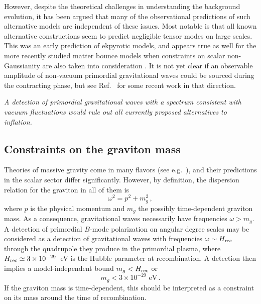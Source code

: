 However, despite the theoretical challenges in understanding the background evolution, it has been argued that many 
of the observational predictions of such alternative models are independent of these issues.
Most notable is that all known alternative constructions seem to predict negligible tensor modes on large scales.
This was an early prediction of ekpyrotic models, and appears true as well for the more recently 
studied matter bounce models when constraints on scalar non-Gaussianity are also taken into consideration \cite{Quintin:2015rta}. It is not yet clear if an observable amplitude of non-vacuum primordial gravitational waves could be sourced during the contracting phase, but see Ref.~\cite{Ben-Dayan:2016iks} for some recent work in that direction.

{\it A detection of primordial gravitational waves with a spectrum consistent with vacuum fluctuations would rule out all currently proposed alternatives to inflation.}

\subsection{Constraints on the graviton mass}

Theories of massive gravity come in many flavors (see e.g.~\cite{Dubovsky:2004sg,Hinterbichler:2011tt}), and their predictions in the scalar sector differ significantly. However, by definition, the dispersion relation for the graviton in all of them is
\begin{equation}
\omega^2=p^2+m_g^2\,,
\end{equation}
where $p$ is the physical momentum and $m_g$ the possibly time-dependent graviton mass. As a consequence, gravitational waves necessarily have frequencies $\omega>m_g$. A detection of primordial $B$-mode polarization on angular degree scales may be considered as a detection of gravitational waves with frequencies $\omega\sim H_{\rm rec}$ through the quadrupole they produce in the primordial plasma, where $H_{\rm rec}\simeq 3\times 10^{-29}$~eV is the Hubble parameter at recombination. A detection then implies a model-independent bound $m_g<H_{\rm rec}$ or 
\begin{equation}
m_g< 3\times 10^{-29}{\mbox{ eV}}\,.
\end{equation}
If the graviton mass is time-dependent, this should be interpreted as a constraint on its mass around the time of recombination.


